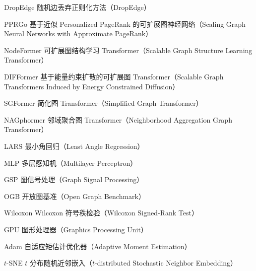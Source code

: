\begin{denotation}[4.0cm]
  \item[DropEdge] 随机边丢弃正则化方法（DropEdge）
  \item[PPRGo] 基于近似 Personalized PageRank 的可扩展图神经网络（Scaling Graph Neural Networks with Approximate PageRank）
  \item[NodeFormer] 可扩展图结构学习 Transformer（Scalable Graph Structure Learning Transformer）
  \item[DIFFormer] 基于能量约束扩散的可扩展图 Transformer（Scalable Graph Transformers Induced by Energy Constrained Diffusion）
  \item[SGFormer] 简化图 Transformer（Simplified Graph Transformer）
  \item[NAGphormer] 邻域聚合图 Transformer（Neighborhood Aggregation Graph Transformer）
  \item[LARS] 最小角回归（Least Angle Regression）
  \item[MLP] 多层感知机（Multilayer Perceptron）
  \item[GSP] 图信号处理（Graph Signal Processing）
  \item[OGB] 开放图基准（Open Graph Benchmark）
  \item[Wilcoxon] Wilcoxon 符号秩检验（Wilcoxon Signed-Rank Test）
  \item[GPU] 图形处理器（Graphics Processing Unit）
  \item[Adam] 自适应矩估计优化器（Adaptive Moment Estimation）
  \item[$t$-SNE] $t$ 分布随机近邻嵌入（$t$-distributed Stochastic Neighbor Embedding）
  

\end{denotation}
